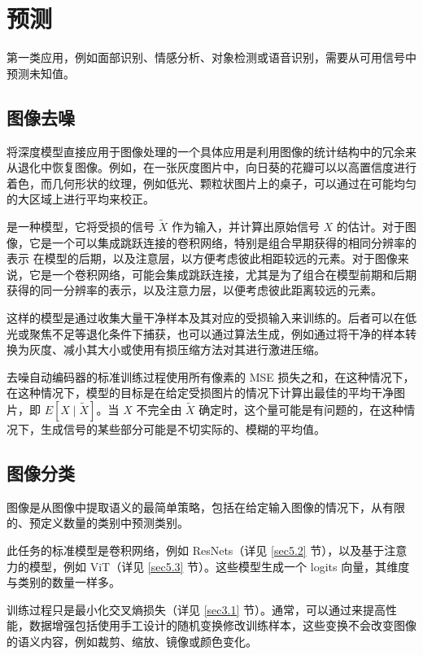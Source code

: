 \chapter{预测}\label{ch6}

第一类应用，例如面部识别、情感分析、对象检测或语音识别，需要从可用信号中预测未知值。

\section{图像去噪}\label{sec6.1}

将深度模型直接应用于图像处理的一个具体应用是利用图像的统计结构中的冗余来从退化中恢复图像。例如，在一张灰度图片中，向日葵的花瓣可以以高置信度进行着色，而几何形状的纹理，例如低光、颗粒状图片上的桌子，可以通过在可能均匀的大区域上进行平均来校正。

是一种模型，它将受损的信号 $\tilde{X}$ 作为输入，并计算出原始信号 $X$ 的估计。对于图像，它是一个可以集成跳跃连接的卷积网络，特别是组合早期获得的相同分辨率的表示 在模型的后期，以及注意层，以方便考虑彼此相距较远的元素。对于图像来说，它是一个卷积网络，可能会集成跳跃连接，尤其是为了组合在模型前期和后期获得的同一分辨率的表示，以及注意力层，以便考虑彼此距离较远的元素。

这样的模型是通过收集大量干净样本及其对应的受损输入来训练的。后者可以在低光或聚焦不足等退化条件下捕获，也可以通过算法生成，例如通过将干净的样本转换为灰度、减小其大小或使用有损压缩方法对其进行激进压缩。

去噪自动编码器的标准训练过程使用所有像素的 MSE 损失之和，在这种情况下，在这种情况下，模型的目标是在给定受损图片的情况下计算出最佳的平均干净图片，即 $E[X \mid \tilde{X}]$。当 $X$ 不完全由 $\tilde{X}$ 确定时，这个量可能是有问题的，在这种情况下，生成信号的某些部分可能是不切实际的、模糊的平均值。

\section{图像分类}\label{sec6.2}

图像是从图像中提取语义的最简单策略，包括在给定输入图像的情况下，从有限的、预定义数量的类别中预测类别。

此任务的标准模型是卷积网络，例如 ResNets（详见 \ref{sec5.2} 节），以及基于注意力的模型，例如 ViT（详见 \ref{sec5.3} 节）。这些模型生成一个 logits 向量，其维度与类别的数量一样多。

训练过程只是最小化交叉熵损失（详见 \ref{sec3.1} 节）。通常，可以通过来提高性能，数据增强包括使用手工设计的随机变换修改训练样本，这些变换不会改变图像的语义内容，例如裁剪、缩放、镜像或颜色变化。

